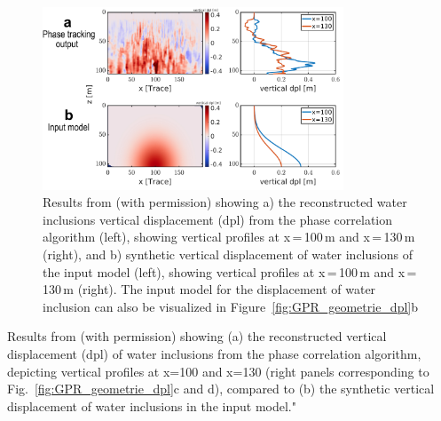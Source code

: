 \begin{figure}[H]
    \centering
    \includegraphics[width=0.8\textwidth]{chapters/Discussion/GPR_dpl_phase.pdf}
    \caption{Results from \cite{Aichele&al2024} (with permission) showing a) the reconstructed water inclusions vertical displacement (dpl) from the phase correlation algorithm (left), showing vertical profiles at x\,=\,100\,m and x\,=\,130\,m (right), and b) synthetic vertical displacement of water inclusions of the input model (left), showing vertical profiles at x\,=\,100\,m and x\,=\,130\,m (right). The input model for the displacement of water inclusion can also be visualized in Figure~\ref{fig:GPR_geometrie_dpl}b}
    \label{fig:GPR_phase}
\end{figure}

Results from \cite{Aichele&al2024} (with permission) showing (a) the reconstructed vertical displacement (dpl) of water inclusions from the phase correlation algorithm, depicting vertical profiles at x=100 and x=130 (right panels corresponding to Fig.~\ref{fig:GPR_geometrie_dpl}c and d), compared to (b) the synthetic vertical displacement of water inclusions in the input model."

